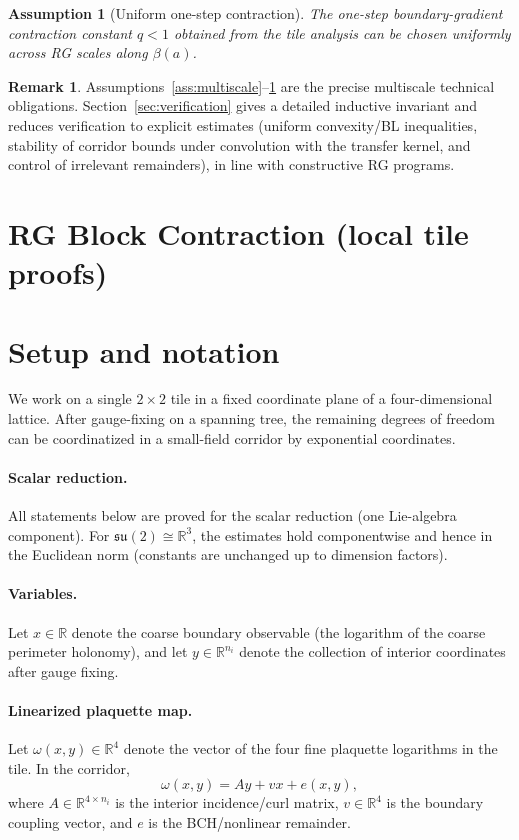 \documentclass[11pt]{article}
\newtheorem{assumption}[theorem]{Assumption}
\theoremstyle{definition}
\newtheorem{remark}[theorem]{Remark}
\newcommand{\1}{\mathbf{1}}
\newcommand{\R}{\mathbb{R}}
\begin{document}
\begin{assumption}[Uniform one-step contraction]\label{ass:uniformq}
The one-step boundary-gradient contraction constant $q<1$ obtained from the tile analysis can be chosen uniformly across RG scales along $\beta(a)$.
\end{assumption}

\begin{remark}
Assumptions~\ref{ass:multiscale}--\ref{ass:uniformq} are the precise multiscale technical obligations. Section~\ref{sec:verification} gives a detailed inductive invariant and reduces verification to explicit estimates (uniform convexity/BL inequalities, stability of corridor bounds under convolution with the transfer kernel, and control of irrelevant remainders), in line with constructive RG programs.
\end{remark}
\section{RG Block Contraction (local tile proofs)}\label{sec:rg}
\section{Setup and notation}

We work on a single $2\times2$ tile in a fixed coordinate plane of a four-dimensional lattice. After gauge-fixing on a spanning tree, the remaining degrees of freedom can be coordinatized in a small-field corridor by exponential coordinates.

\paragraph{Scalar reduction.}
All statements below are proved for the scalar reduction (one Lie-algebra component). For $\mathfrak{su}(2)\cong\R^3$, the estimates hold componentwise and hence in the Euclidean norm (constants are unchanged up to dimension factors).

\paragraph{Variables.}
Let $x\in\R$ denote the coarse boundary observable (the logarithm of the coarse perimeter holonomy), and let $y\in\R^{n_i}$ denote the collection of interior coordinates after gauge fixing.

\paragraph{Linearized plaquette map.}
Let $\omega(x,y)\in\R^4$ denote the vector of the four fine plaquette logarithms in the tile. In the corridor,
\begin{equation}\label{eq:omega-linear}
\omega(x,y)=Ay+vx+e(x,y),
\end{equation}
where $A\in\R^{4\times n_i}$ is the interior incidence/curl matrix, $v\in\R^4$ is the boundary coupling vector, and $e$ is the BCH/nonlinear remainder.
\end{document}
